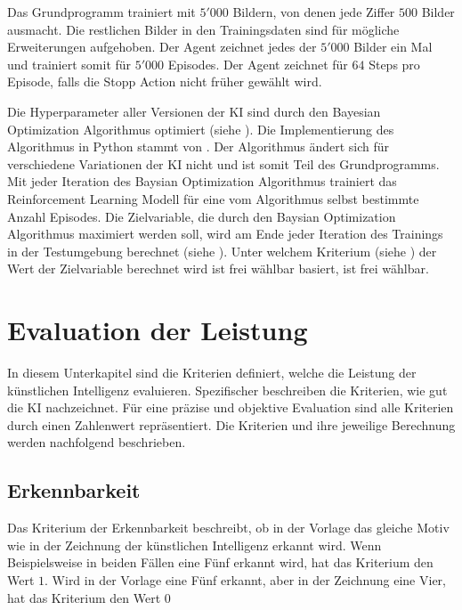  
Das Grundprogramm trainiert mit $5'000$ Bildern, von denen jede Ziffer $500$
Bilder ausmacht. Die restlichen Bilder in den Trainingsdaten sind für mögliche 
Erweiterungen aufgehoben. Der Agent zeichnet jedes der $5'000$ Bilder ein Mal und
trainiert somit für $5'000$ Episodes. Der Agent zeichnet für $64$ Steps pro
Episode, falls die Stopp Action nicht früher gewählt wird.
 
Die Hyperparameter aller Versionen der KI sind durch den Bayesian Optimization
Algorithmus optimiert (siehe ). Die Implementierung
des Algorithmus in Python stammt von \cite{fernando_nogueira_bayesian_2014}. Der
Algorithmus ändert sich für verschiedene Variationen der KI nicht und ist somit
Teil des Grundprogramms. Mit jeder Iteration des Baysian Optimization
Algorithmus trainiert das Reinforcement Learning Modell für eine vom Algorithmus
selbst bestimmte Anzahl Episodes. Die Zielvariable, die durch den Baysian
Optimization Algorithmus maximiert werden soll, wird am Ende jeder Iteration des
Trainings in der Testumgebung berechnet (siehe ).
Unter welchem Kriterium (siehe ) der Wert der
Zielvariable berechnet wird ist frei wählbar  
basiert, ist frei wählbar.
 
\section{Evaluation der Leistung}\label{chap:m_eval}
In diesem Unterkapitel sind die Kriterien definiert, welche die Leistung der
künstlichen Intelligenz evaluieren. Spezifischer beschreiben die
Kriterien, wie gut die KI nachzeichnet. Für eine präzise und objektive
Evaluation sind alle Kriterien durch einen Zahlenwert repräsentiert. Die
Kriterien und ihre jeweilige Berechnung werden nachfolgend beschrieben.
 
\subsection{Erkennbarkeit}\label{sub:m_eval_rec}
Das Kriterium der Erkennbarkeit beschreibt, ob in der Vorlage das gleiche Motiv
wie in der Zeichnung der künstlichen Intelligenz erkannt wird. Wenn
Beispielsweise in beiden Fällen eine Fünf erkannt wird, hat das Kriterium den
Wert $1$. Wird in der Vorlage eine Fünf erkannt, aber in der Zeichnung eine
Vier, hat das Kriterium den Wert $0$
 
